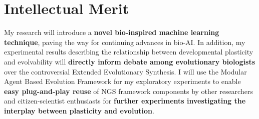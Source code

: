 \section{Intellectual Merit}
My research will introduce a \textbf{novel bio-inspired machine learning technique}, paving the way for continuing advances in bio-AI.
In addition, my experimental results describing the relationship between developmental plasticity and evolvability will \textbf{directly inform debate among evolutionary biologists} over the controversial Extended Evolutionary Synthesis.\autocite{Laland2014DoesRethink}
I will use the Modular Agent Based Evolution Framework for my exploratory experiments to enable \textbf{easy plug-and-play reuse} of NGS framework components by other researchers and citizen-scientist enthusiasts for \textbf{further experiments investigating the interplay between plasticity and evolution}.\autocite{Hintze2017Mabe}
